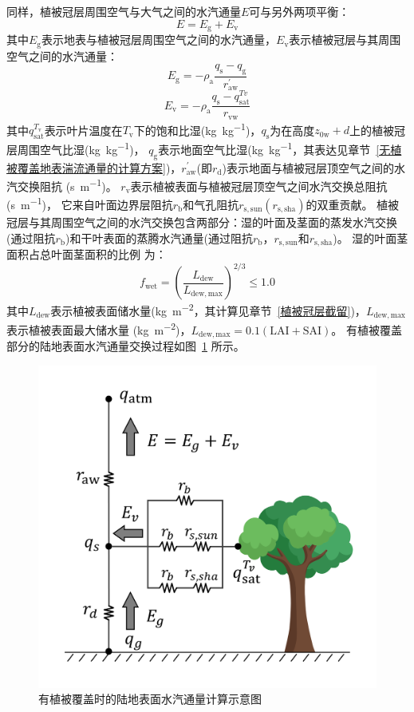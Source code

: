 同样，植被冠层周围空气与大气之间的水汽通量$E$可与另外两项平衡：
\begin{equation}\label{EV_balance}
  E=E_{\mathrm{g}}+E_{\mathrm{v}}
\end{equation}
其中$E_{\mathrm{g}}$表示地表与植被冠层周围空气之间的水汽通量，$E_{\mathrm{v}}$表示植被冠层与其周围空气之间的水汽通量：
\begin{equation}\label{eq:Eg}
  E_{\mathrm{g}}=-\rho_{\mathrm{a}} \frac{q_{\mathrm{s}}-q_{\mathrm{g}}}{r_{\mathrm{a w}}^{\prime}}
\end{equation}
\begin{equation}
  E_{\mathrm{v}}=-\rho_{\mathrm{a}} \frac{q_{\mathrm{s}}-q_{\mathrm{s a t}}^{T v}}{r_{\mathrm{vw}}}
\end{equation}
其中$q_{\mathrm{sat}}^{T_{\mathrm v}}$表示叶片温度在$T_{\mathrm v}$下的饱和比湿(\unit{kg.kg^{-1}})，$q_{\mathrm {s}}$为在高度$z_{\mathrm{0w}}+d$上的植被冠层周围空气比湿(\unit{kg.kg^{-1}})，
$q_{\mathrm {g}}$表示地面空气比湿(\unit{kg.kg^{-1}}，其表达见章节~\ref{无植被覆盖地表湍流通量的计算方案})，$r_{\mathrm{aw}}^\prime$(即$r_{\mathrm {d}}$)表示地面与植被冠层顶空气之间的水汽交换阻抗 (\unit{s.m^{-1}})。
$r_{\mathrm{v}}$表示植被表面与植被冠层顶空气之间水汽交换总阻抗 (\unit{s.m^{-1}})，
它来自叶面边界层阻抗$r_{\mathrm {b}}$和气孔阻抗$r_{\mathrm{s,sun}}\left(r_{\mathrm{s,sha}}\right)$的双重贡献。
植被冠层与其周围空气之间的水汽交换包含两部分：湿的叶面及茎面的蒸发水汽交换(通过阻抗$r_{\mathrm {b}}$)和干叶表面的蒸腾水汽通量(通过阻抗$r_{\mathrm {b}}$，$r_{\mathrm{s,sun}}$和$r_{\mathrm{s,sha}}$)。
湿的叶面茎面积占总叶面茎面积的比例 \citep{dickinson1993biosphere} 为：
\begin{equation}\label{eq:fwet}
  f_{\mathrm{wet}}=\left(\frac{L_{\mathrm{dew}}}{L_{\mathrm{dew,max }}}\right)^{2 / 3} \leqslant 1.0
\end{equation}
其中$L_{\mathrm{dew}}$表示植被表面储水量(\unit{kg.m^{-2}}，其计算见章节~\ref{植被冠层截留})，$L_{\mathrm{dew,max}}$表示植被表面最大储水量
(\unit{kg.m^{-2}})，$L_{\mathrm{dew,max}}=0.1\left(\text {LAI}+ \text {SAI}\right)$。
有植被覆盖部分的陆地表面水汽通量交换过程如图~\ref{fig:有植被覆盖部分的陆地表面水汽通量示意图} 所示。
{
  \begin{figure}[htbp]
    \centering
    \includegraphics[width=0.6\linewidth]{Figures/地表湍流交换过程/有植被潜热交换阻抗示意图.png}
    \caption{有植被覆盖时的陆地表面水汽通量计算示意图}
    \label{fig:有植被覆盖部分的陆地表面水汽通量示意图}
  \end{figure}
}

